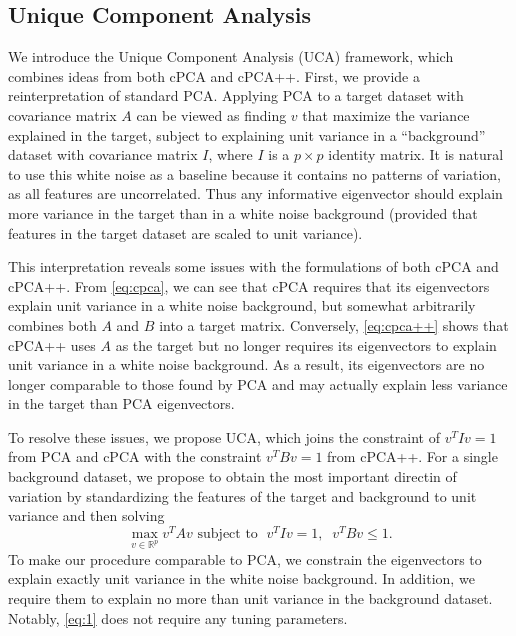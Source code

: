 \documentclass[12pt]{article}
\begin{document}
\subsection{Unique Component Analysis}
We introduce the Unique Component Analysis (UCA) framework, which combines ideas from both cPCA and cPCA++. First, we provide a reinterpretation of standard PCA. Applying PCA to a target dataset with covariance matrix $A$ can be viewed as finding $v$ that maximize the variance explained in the target, subject to explaining unit variance in a ``background'' dataset with covariance matrix $I$, where $I$ is a $p \times p$ identity matrix. It is natural to use this white noise as a baseline because it contains no patterns of variation, as all features are uncorrelated. Thus any informative eigenvector should explain more variance in the target than in a white noise background (provided that features in the target dataset are scaled to unit variance).

This interpretation reveals some issues with the formulations of both cPCA and cPCA++. From \eqref{eq:cpca}, we can see that cPCA requires that its eigenvectors explain unit variance in a white noise background, but somewhat arbitrarily combines both $A$ and $B$ into a target matrix. Conversely, \eqref{eq:cpca++} shows that cPCA++ uses $A$ as the target but no longer requires its eigenvectors to explain unit variance in a white noise background. As a result, its eigenvectors are no longer comparable to those found by PCA and may actually explain less variance in the target than PCA eigenvectors.

To resolve these issues, we propose UCA, which joins the constraint of $v^T I v = 1$ from PCA and cPCA with the constraint $v^T Bv = 1$ from cPCA++. For a single background dataset, we propose to obtain the most important directin of variation by standardizing the features of the target and background to unit variance and then solving
\begin{equation}
  \label{eq:1}
  \max_{v\in \mathbb{R}^p}{v^TAv} \text{ subject to }\; v^T I v=1,\;\; v^TBv \leq 1.
\end{equation}
To make our procedure comparable to PCA, we constrain the eigenvectors to explain exactly unit variance in the white noise background. In addition, we require them to explain no more than unit variance in the background dataset. Notably, \eqref{eq:1} does not require any tuning parameters.
\end{document}
